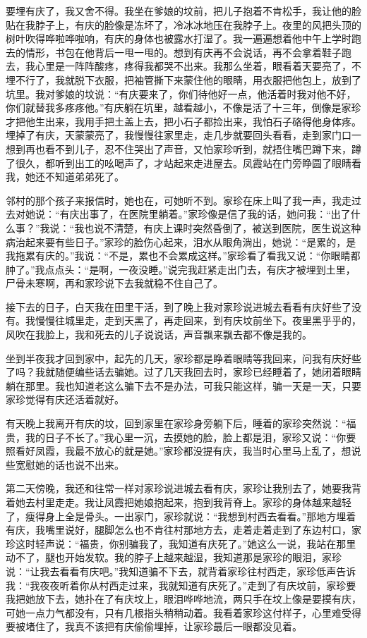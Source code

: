 \documentclass[12pt,UTF8]{ctexbook}
\begin{document}
要埋有庆了，我又舍不得。我坐在爹娘的坟前，把儿子抱着不肯松手，我让他的脸贴在我脖子上，有庆的脸像是冻坏了，冷冰冰地压在我脖子上。夜里的风把头顶的树叶吹得哗啦哗啦响，有庆的身体也被露水打湿了。我一遍遍想着他中午上学时跑去的情形，书包在他背后一甩一甩的。想到有庆再不会说话，再不会拿着鞋子跑去，我心里是一阵阵酸疼，疼得我都哭不出来。我那么坐着，眼看着天要亮了，不埋不行了，我就脱下衣服，把袖管撕下来蒙住他的眼睛，用衣服把他包上，放到了坑里。我对爹娘的坟说：“有庆要来了，你们待他好一点，他活着时我对他不好，你们就替我多疼疼他。”有庆躺在坑里，越看越小，不像是活了十三年，倒像是家珍才把他生出来，我用手把土盖上去，把小石子都捡出来，我怕石子硌得他身体疼。埋掉了有庆，天蒙蒙亮了，我慢慢往家里走，走几步就要回头看看，走到家门口一想到再也看不到儿子，忍不住哭出了声音，又怕家珍听到，就捂住嘴巴蹲下来，蹲了很久，都听到出工的吆喝声了，才站起来走进屋去。凤霞站在门旁睁圆了眼睛看我，她还不知道弟弟死了。

邻村的那个孩子来报信时，她也在，可她听不到。家珍在床上叫了我一声，我走过去对她说：“有庆出事了，在医院里躺着。”家珍像是信了我的话，她问我：“出了什么事？”我说：“我也说不清楚，有庆上课时突然昏倒了，被送到医院，医生说这种病治起来要有些日子。”家珍的脸伤心起来，泪水从眼角淌出，她说：“是累的，是我拖累有庆的。”我说：“不是，累也不会累成这样。”家珍看了看我又说：“你眼睛都肿了。”我点点头：“是啊，一夜没睡。”说完我赶紧走出门去，有庆才被埋到土里，尸骨未寒啊，再和家珍说下去我就稳不住自己了。

接下去的日子，白天我在田里干活，到了晚上我对家珍说进城去看看有庆好些了没有。我慢慢往城里走，走到天黑了，再走回来，到有庆坟前坐下。夜里黑乎乎的，风吹在我脸上，我和死去的儿子说说话，声音飘来飘去都不像是我的。

坐到半夜我才回到家中，起先的几天，家珍都是睁着眼睛等我回来，问我有庆好些了吗？我就随便编些话去骗她。过了几天我回去时，家珍已经睡着了，她闭着眼睛躺在那里。我也知道老这么骗下去不是办法，可我只能这样，骗一天是一天，只要家珍觉得有庆还活着就好。

有天晚上我离开有庆的坟，回到家里在家珍身旁躺下后，睡着的家珍突然说：“福贵，我的日子不长了。”我心里一沉，去摸她的脸，脸上都是泪，家珍又说：“你要照看好凤霞，我最不放心的就是她。”家珍都没提有庆，我当时心里马上乱了，想说些宽慰她的话也说不出来。

第二天傍晚，我还和往常一样对家珍说进城去看有庆，家珍让我别去了，她要我背着她去村里走走。我让凤霞把她娘抱起来，抱到我背脊上。家珍的身体越来越轻了，瘦得身上全是骨头。一出家门，家珍就说：“我想到村西去看看。”那地方埋着有庆，我嘴里说好，腿脚怎么也不肯往村那地方去，走着走着走到了东边村口，家珍这时轻声说：“福贵，你别骗我了，我知道有庆死了。”她这么一说，我站在那里动不了，腿也开始发软。我的脖子上越来越湿，我知道那是家珍的眼泪，家珍说：“让我去看看有庆吧。”我知道骗不下去，就背着家珍往村西走，家珍低声告诉我：“我夜夜听着你从村西走过来，我就知道有庆死了。”走到了有庆坟前，家珍要我把她放下去，她扑在了有庆坟上，眼泪哗哗地流，两只手在坟上像是要摸有庆，可她一点力气都没有，只有几根指头稍稍动着。我看着家珍这付样子，心里难受得要被堵住了，我真不该把有庆偷偷埋掉，让家珍最后一眼都没见着。
\end{document}
